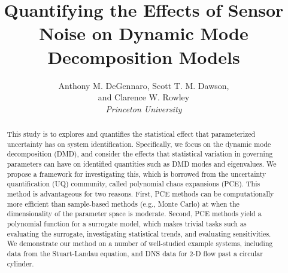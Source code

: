 \documentclass[12pt]{article}
\title{Quantifying the Effects of Sensor Noise on Dynamic Mode Decomposition Models}
\author{%
  Anthony M. DeGennaro, 
  Scott T. M. Dawson, \\ and
  Clarence W. Rowley\\
  \itshape
   Princeton University\\
 }
\begin{document}
\maketitle

\begin{abstract}
 This study is to explores and quantifies the statistical
  effect that parameterized uncertainty has on system
  identification. Specifically, we focus on the dynamic mode decomposition (DMD), and consider
  the effects that statistical variation in governing parameters
  can have on identified quantities such as DMD modes and eigenvalues. 
  We propose a framework for
  investigating this, which is borrowed from the uncertainty
  quantification (UQ) community, called polynomial chaos expansions
  (PCE). This method is advantageous for two reasons. First, PCE
  methods can be computationally more efficient than sample-based
  methods (e.g., Monte Carlo) at when the dimensionality of the
  parameter space is moderate. Second, PCE methods yield a polynomial
  function for a surrogate model, which makes trivial tasks such as
  evaluating the surrogate, investigating statistical trends, and
  evaluating sensitivities.
  We demonstrate our method on a number of well-studied example systems, including data from the 
  Stuart-Landau equation, and DNS data for 2-D flow past a circular
  cylinder. 

\end{abstract}
\end{document}
